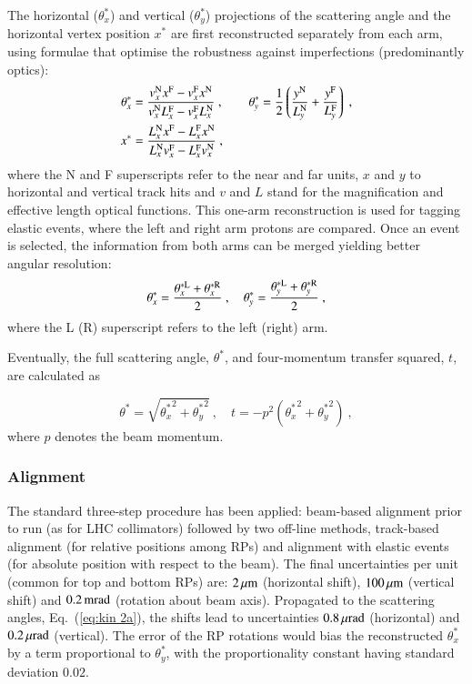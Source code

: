 The horizontal ($\theta_x^*$) and vertical ($\theta_y^*$) projections of the scattering angle and the horizontal vertex position $x^*$ are first reconstructed separately from each arm, using formulae that optimise the robustness against imperfections (predominantly optics):
\begin{equation}
\label{eq:kin 1a}
	\begin{aligned}
		\theta_x^* &= {v_x^{\rm N} x^{\rm F} - v_x^{\rm F} x^{\rm N}\over v_x^{\rm N} L_x^{\rm F} - v_x^{\rm F} L_x^{\rm N}}\ ,\qquad
		\theta_y^* = {1\over 2} \left( {y^{\rm N}\over L_y^{\rm N}} + {y^{\rm F}\over L_y^{\rm F}} \right)\ ,\\
		x^* &= {L_x^{\rm N} x^{\rm F} - L_x^{\rm F} x^{\rm N}\over L_x^{\rm N} v_x^{\rm F} - L_x^{\rm F} v_x^{\rm N}}\ , \\
	\end{aligned}
\end{equation}
where the N and F superscripts refer to the near and far units, $x$ and $y$ to horizontal and vertical track hits and $v$ and $L$ stand for the magnification and effective length optical functions. This one-arm reconstruction is used for tagging elastic events, where the left and right arm protons are compared. Once an event is selected, the information from both arms can be merged yielding better angular resolution:
\begin{equation}
\label{eq:kin 2a}
\theta_x^* = {\theta_x^{*\rm L} + \theta_x^{*\rm R} \over 2}\ ,\quad \theta_y^* = {\theta_y^{*\rm L} + \theta_y^{*\rm R} \over 2}\ ,
\end{equation}
where the L (R) superscript refers to the left (right) arm.

Eventually, the full scattering angle, $\theta^*$, and four-momentum transfer squared, $t$, are calculated as

\begin{equation}
\label{eq:th t}
\theta^* = \sqrt{{\theta_x^*}^2 + {\theta_y^*}^2}\ ,\quad t = - p^2 ({\theta_x^*}^2 + {\theta_y^*}^2)\ ,
\end{equation}
where $p$ denotes the beam momentum.


\subsubsection{Alignment}
\label{sec:alignment}

The standard three-step procedure \cite{totem-ijmp} has been applied: beam-based alignment prior to run (as for LHC collimators) followed by two off-line methods, track-based alignment (for relative positions among RPs) and alignment with elastic events (for absolute position with respect to the beam). The final uncertainties per unit (common for top and bottom RPs) are: $2\,{\rm \mu m}$ (horizontal shift), $100\,{\rm \mu m}$ (vertical shift) and $0.2\,{\rm mrad}$ (rotation about beam axis). Propagated to the scattering angles, Eq.~(\ref{eq:kin 2a}), the shifts lead to uncertainties $0.8\,{\rm \mu rad}$ (horizontal) and $0.2\,{\rm \mu rad}$ (vertical). The error of the RP rotations would bias the reconstructed $\theta_x^*$ by a term proportional to $\theta_y^*$, with the proportionality constant having standard deviation $0.02$.


